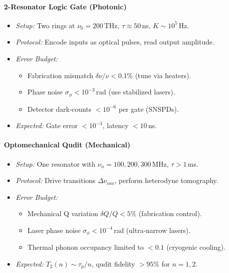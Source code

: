 \paragraph{2-Resonator Logic Gate (Photonic)}  
\begin{itemize}
  \item \emph{Setup:} Two rings at $\nu_0=200\,$THz, $\tau\approx50\,$ns, $K\sim10^5\,$Hz.
  \item \emph{Protocol:} Encode inputs as optical pulses, read output amplitude.
  \item \emph{Error Budget:}
    \begin{itemize}
      \item Fabrication mismatch $\delta \nu/\nu<0.1\%$ (tune via heaters).
      \item Phase noise $\sigma_\phi<10^{-3}\,$rad (use stabilized lasers).
      \item Detector dark‐counts $<10^{-6}$ per gate (SNSPDs).
    \end{itemize}
  \item \emph{Expected:} Gate error $<10^{-3}$, latency $<10\,$ns.
\end{itemize}

\paragraph{Optomechanical Qudit (Mechanical)}  
\begin{itemize}
  \item \emph{Setup:} One resonator with $\nu_n=100,200,300\,$MHz, $\tau>1\,$ms.
  \item \emph{Protocol:} Drive transitions $\Delta\nu_{nm}$, perform heterodyne tomography.
  \item \emph{Error Budget:}
    \begin{itemize}
      \item Mechanical Q variation $\delta Q/Q<5\%$ (fabrication control).
      \item Laser phase noise $\sigma_\phi<10^{-4}\,$rad (ultra‐narrow lasers).
      \item Thermal phonon occupancy limited to $<0.1$ (cryogenic cooling).
    \end{itemize}
  \item \emph{Expected:} $T_2(n)\sim\tau_p/n$, qudit fidelity $>95\%$ for $n=1,2$.
\end{itemize}

